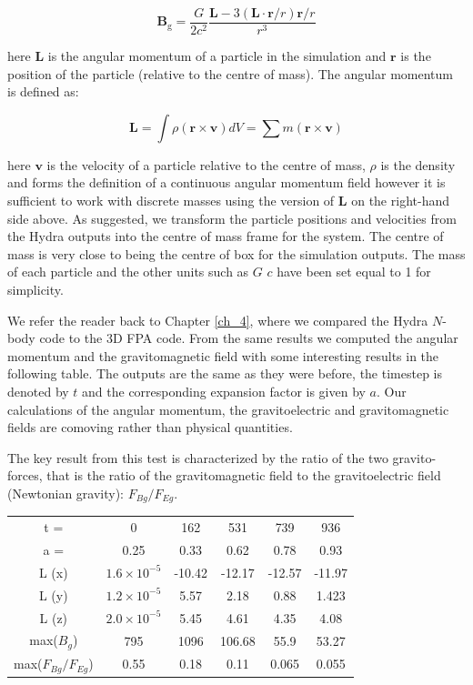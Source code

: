 \begin{equation}
\mathbf{B}_\text{g} = \frac{G }{2 c^2} \frac{\mathbf{L} - 3(\mathbf{L} \cdot \mathbf{r}/r) \mathbf{r}/r}{r^3}
\end{equation}

\noindent here $\mathbf{L}$ is the angular momentum of a particle in the simulation and $\mathbf{r}$ is the position of the particle (relative to the centre of mass). The angular momentum is defined as:

\begin{equation}
\mathbf{L} = \int \rho (\mathbf{r} \times \mathbf{v}) dV = \sum m (\mathbf{r} \times \mathbf{v})
\end{equation}

\noindent here $\mathbf{v}$ is the velocity of a particle relative to the centre of mass, $\rho$ is the density and forms the definition of a continuous angular momentum field however it is sufficient to work with discrete masses using the version of $\mathbf{L}$ on the right-hand side above. As suggested, we transform the particle positions and velocities from the Hydra outputs into the centre of mass frame for the system. The centre of mass is very close to being the centre of box for the simulation outputs. The mass of each particle and the other units such as $G$ $c$ have been set equal to 1 for simplicity.

We refer the reader back to Chapter \ref{ch_4}, where we compared the Hydra $N$-body code to the 3D FPA code. From the same results we computed the angular momentum and the gravitomagnetic field with some interesting results in the following table. The outputs are the same as they were before, the timestep is denoted by $t$ and the corresponding expansion factor is given by $a$. Our calculations of the angular momentum, the gravitoelectric and gravitomagnetic fields are comoving rather than physical quantities.

The key result from this test is characterized by the ratio of the two gravito-forces, that is the ratio of the gravitomagnetic field to the gravitoelectric field (Newtonian gravity): $F_{Bg}/F_{Eg}$.

\vspace*{1cm}
\begin{center}
\begin{tabular}{|c|c|c|c|c|c|}
  \hline
  t = & 0 & 162 & 531 & 739 & 936 \\
  a = & 0.25 & 0.33 & 0.62 & 0.78 & 0.93 \\  \hline
  L (x) & $1.6\times 10^{-5}$&-10.42 & -12.17&-12.57& -11.97 \\
  L (y) & $1.2\times 10^{-5}$& 5.57  &  2.18 & 0.88 & 1.423  \\
  L (z) & $2.0\times 10^{-5}$  & 5.45  &  4.61 & 4.35 & 4.08 \\ \hline
  max($B_g$) & 795 & 1096 & 106.68 & 55.9 & 53.27 \\
  max($F_{Bg}/F_{Eg}$) & 0.55 & 0.18 & 0.11 & 0.065 & 0.055 \\
  \hline
\end{tabular}
\end{center}
\vspace*{1cm}


